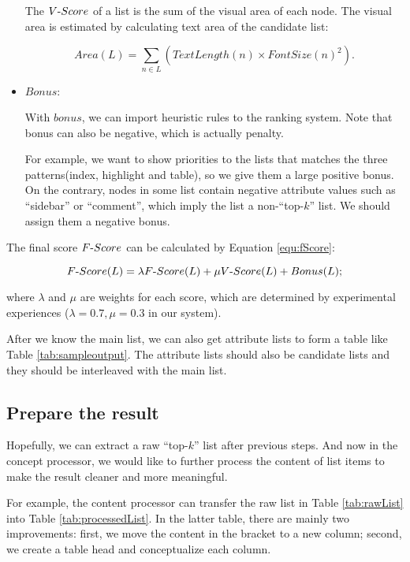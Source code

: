 \begin{itemize}
The $V\textnormal{-}Score$ of a list is the sum of the visual area of each node.
The visual area is estimated by calculating text area
of the candidate list:

\begin{equation}\label{equ:vScore}
Area(L)= \sum_{n \in L} (TextLength(n)\times FontSize(n)^2).
\end{equation}

  \item \textbf{$Bonus$}:

  With $bonus$, we can import heuristic rules to the ranking system. Note that bonus can also be negative, which is actually penalty.

  For example, we want to show priorities to the lists that matches the three patterns(index, highlight and table), so we give them a large positive bonus. On the contrary, nodes in some list contain negative attribute values such as ``sidebar'' or ``comment'',
  which imply the list a non-``top-$k$'' list. We should assign them a negative bonus.

\end{itemize}

The final score $F\textnormal{-}Score$ can be calculated by Equation \ref{equ:fScore}:

\begin{equation}\label{equ:fScore}
    F\textnormal{-}Score(L)= \lambda F\textnormal{-}Score(L)+ \mu V\textnormal{-}Score(L)+Bonus(L);
\end{equation}

where $\lambda$ and $\mu$ are weights for each score, which are determined by experimental experiences
($\lambda=0.7, \mu=0.3$ in our system).

After we know the main list, we can also get attribute lists to form a table like Table \ref{tab:sampleoutput}.
The attribute lists should also be candidate lists and they should be interleaved with the main list.

\subsection{Prepare the result}

Hopefully, we can extract a raw ``top-$k$'' list after previous steps. And now in the concept processor,
we would like to further process the content of list items to make the result cleaner and more meaningful.

For example, the content processor can transfer the raw list in Table \ref{tab:rawList} into Table \ref{tab:processedList}.
In the latter table, there are mainly two improvements: first, we move the content in the bracket to a new column; second, we create a table head and conceptualize each column.

